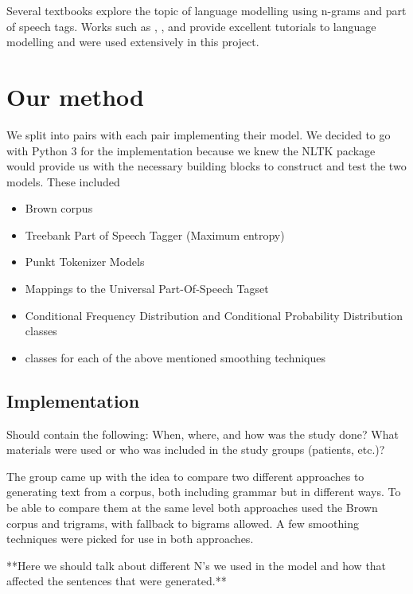 \documentclass[a4paper,12pt]{article}
\begin{document}
Several textbooks explore the topic of language modelling using n-grams and part of speech tags. Works such as \cite{Jurafsky2000}, \cite{RussellNorvigAIBook3rd}, and \cite{Chen98anempirical} provide excellent tutorials to language modelling and were used extensively in this project.

\section{Our method}
\label{sec:method}

We split into pairs with each pair implementing their model. We decided to go with Python 3 for the implementation because we knew the NLTK package would provide us with the necessary building blocks to construct and test the two models. These included

\begin{itemize}
\item Brown corpus
\item Treebank Part of Speech Tagger (Maximum entropy)
\item Punkt Tokenizer Models
\item Mappings to the Universal Part-Of-Speech Tagset
\item Conditional Frequency Distribution and Conditional Probability Distribution classes
\item classes for each of the above mentioned smoothing techniques
\end{itemize}




\subsection{Implementation}
\label{sec:impl}

Should contain the following: When, where, and how was the study done? What materials were used or who was included in the study groups (patients, etc.)?


The group came up with the idea to compare two different approaches to generating text from a corpus, both including grammar but in different ways. To be able to compare them at the same level both approaches used the Brown corpus and trigrams, with fallback to bigrams allowed. A few smoothing techniques were picked for use in both approaches.

**Here we should talk about different N's we used in the model and how that affected the sentences that were generated.**
\end{document}
